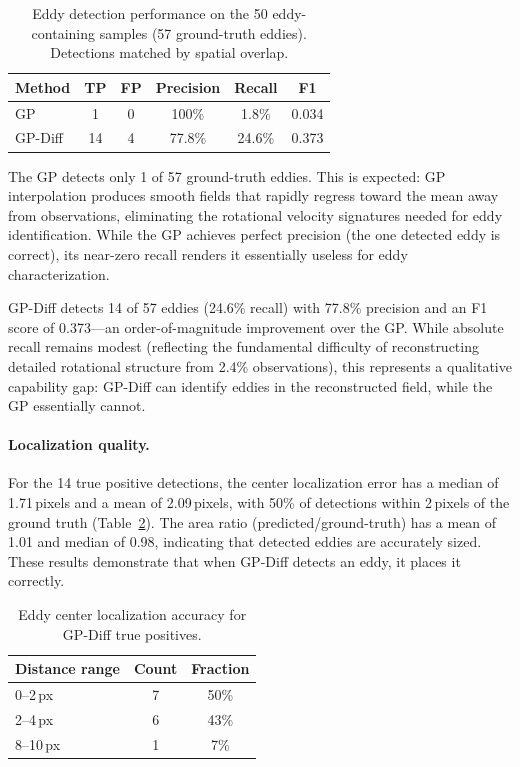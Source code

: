 \documentclass{article}
\begin{document}
\begin{table}[t]
\centering
\caption{Eddy detection performance on the 50 eddy-containing samples (57 ground-truth eddies). Detections matched by spatial overlap.}
\label{tab:eddy}
\begin{tabular}{lccccc}
\toprule
\textbf{Method} & \textbf{TP} & \textbf{FP} & \textbf{Precision} & \textbf{Recall} & \textbf{F1} \\
\midrule
GP & 1 & 0 & 100\% & 1.8\% & 0.034 \\
GP-Diff & 14 & 4 & 77.8\% & 24.6\% & 0.373 \\
\bottomrule
\end{tabular}
\end{table}

The GP detects only 1 of 57 ground-truth eddies. This is expected: GP interpolation produces smooth fields that rapidly regress toward the mean away from observations, eliminating the rotational velocity signatures needed for eddy identification. While the GP achieves perfect precision (the one detected eddy is correct), its near-zero recall renders it essentially useless for eddy characterization.

GP-Diff detects 14 of 57 eddies (24.6\% recall) with 77.8\% precision and an F1 score of 0.373---an order-of-magnitude improvement over the GP. While absolute recall remains modest (reflecting the fundamental difficulty of reconstructing detailed rotational structure from 2.4\% observations), this represents a qualitative capability gap: GP-Diff can identify eddies in the reconstructed field, while the GP essentially cannot.

\paragraph{Localization quality.} For the 14 true positive detections, the center localization error has a median of 1.71\,pixels and a mean of 2.09\,pixels, with 50\% of detections within 2\,pixels of the ground truth (Table~\ref{tab:eddy_localization}). The area ratio (predicted/ground-truth) has a mean of 1.01 and median of 0.98, indicating that detected eddies are accurately sized. These results demonstrate that when GP-Diff detects an eddy, it places it correctly.

\begin{table}[t]
\centering
\caption{Eddy center localization accuracy for GP-Diff true positives.}
\label{tab:eddy_localization}
\begin{tabular}{lcc}
\toprule
\textbf{Distance range} & \textbf{Count} & \textbf{Fraction} \\
\midrule
0--2\,px & 7 & 50\% \\
2--4\,px & 6 & 43\% \\
8--10\,px & 1 & 7\% \\
\bottomrule
\end{tabular}
\end{table}
\end{document}
